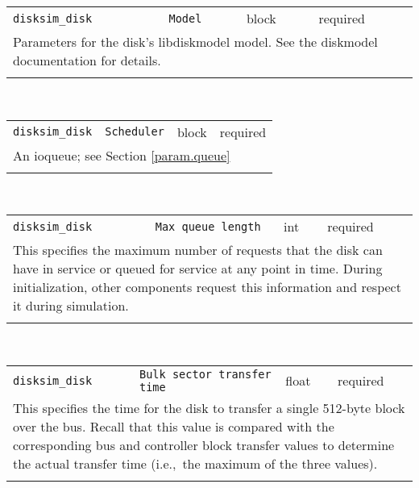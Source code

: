\noindent 
\begin{tabular}{|p{\lpmodwidth}|p{\lpnamewidth}|p{0.5in}|p{0.5in}|}
\cline{1-4}
\texttt{disksim\_disk} & \texttt{Model} & block & required \\ 
\cline{1-4}
\multicolumn{4}{|p{6in}|}{
Parameters for the disk's libdiskmodel model. See the diskmodel
documentation for details.
}\\ 
\cline{1-4}
\multicolumn{4}{p{5in}}{}\\
\end{tabular}\\ 
\noindent 
\begin{tabular}{|p{\lpmodwidth}|p{\lpnamewidth}|p{0.5in}|p{0.5in}|}
\cline{1-4}
\texttt{disksim\_disk} & \texttt{Scheduler} & block & required \\ 
\cline{1-4}
\multicolumn{4}{|p{6in}|}{
An ioqueue; see Section \ref{param.queue}
}\\ 
\cline{1-4}
\multicolumn{4}{p{5in}}{}\\
\end{tabular}\\ 
\noindent 
\begin{tabular}{|p{\lpmodwidth}|p{\lpnamewidth}|p{0.5in}|p{0.5in}|}
\cline{1-4}
\texttt{disksim\_disk} & \texttt{Max queue length} & int & required \\ 
\cline{1-4}
\multicolumn{4}{|p{6in}|}{
This specifies the maximum number of requests that the disk can have in
service or queued for service at any point in time. During
initialization, other components request this information and respect
it during simulation.
}\\ 
\cline{1-4}
\multicolumn{4}{p{5in}}{}\\
\end{tabular}\\ 
\noindent 
\begin{tabular}{|p{\lpmodwidth}|p{\lpnamewidth}|p{0.5in}|p{0.5in}|}
\cline{1-4}
\texttt{disksim\_disk} & \texttt{Bulk sector transfer time} & float & required \\ 
\cline{1-4}
\multicolumn{4}{|p{6in}|}{
This specifies the time for the disk to transfer a single 512-byte block
over the bus. Recall that this value is compared with the
corresponding bus and controller block transfer values to determine
the actual transfer time (i.e.,~the maximum of the three values).
}\\ 
\cline{1-4}
\multicolumn{4}{p{5in}}{}\\
\end{tabular}\\ 
